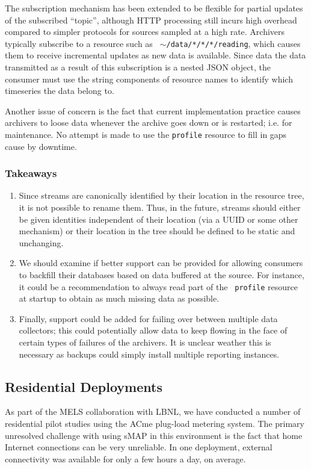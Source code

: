 \documentclass[10pt,letterpaper]{article}
\newcommand{\smap}{sMAP}
\begin{document}
The subscription mechanism has been extended to be flexible for partial
updates of the subscribed ``topic'', although HTTP processing still incurs
high overhead compared to simpler protocols for sources sampled at a high
rate.  Archivers typically subscribe to a resource such as {\tt
 $\sim$/data/*/*/*/reading}, which causes them to receive incremental updates as
new data is available.  Since data the data transmitted as a result of this
subscription is a nested JSON object, the consumer must use the string
components of resource names to identify which timeseries the data belong to.

Another issue of concern is the fact that current implementation practice
causes archivers to loose data whenever the archive goes down or is restarted;
i.e. for maintenance.  No attempt is made to use the {\tt profile} resource to
fill in gaps cause by downtime.

\subsubsection{Takeaways}
\begin{enumerate}
\item Since streams are canonically identified by their location in the resource
tree, it is not possible to rename them.  Thus, in the future, streams should
either be given identities independent of their location (via a UUID or some
other mechanism) or their location in the tree should be defined to be static
and unchanging.
\item We should examine if better support can be provided for allowing
  consumers to backfill their databases based on data buffered at the source.
  For instance, it could be a recommendation to always read part of the {\tt
    profile} resource at startup to obtain as much missing data as possible.
\item Finally, support could be added for failing over between multiple data
  collectors; this could potentially allow data to keep flowing in the face of
  certain types of failures of the archivers.  It is unclear weather this is
  necessary as backups could simply install multiple reporting instances.
\end{enumerate}

\subsection{Residential Deployments}

As part of the MELS collaboration with LBNL, we have conducted a number of
residential pilot studies using the ACme plug-load metering system.  The
primary unresolved challenge with using \smap{} in this environment is the
fact that home Internet connections can be very unreliable.  In one
deployment, external connectivity was available for only a few hours a day, on
average.  
\end{document}
